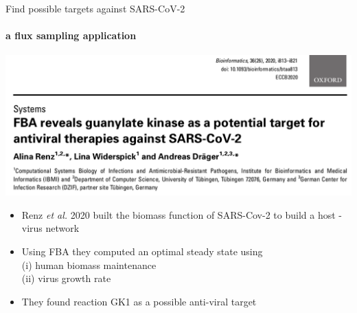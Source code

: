 \documentclass{beamer}
\begin{document}
   \begin{frame}{Find possible targets against SARS-CoV-2}
      \framesubtitle{a flux sampling application}
      \bigskip
      \includegraphics[scale=0.27]{ ../met_nets/resources//covid_paper.png}
      
      \begin{singlespace}
         \begin{itemize}
            \item \small Renz \textit{et al.} 2020 built the biomass function of SARS-Cov-2 to build a host - virus network
            \item \small Using FBA they computed an optimal steady state using \\ \small \quad (i) human biomass maintenance\\ \small \quad (ii) virus growth rate
            \item \small They found reaction GK1 as a possible anti-viral target
         \end{itemize}            
      \end{singlespace}

   \end{frame}


   \fi
\end{document}

